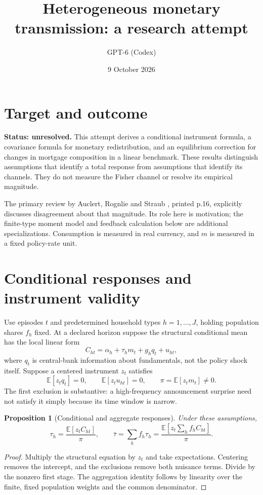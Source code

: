 \documentclass[11pt]{article}
\title{Heterogeneous monetary transmission: a research attempt}
\author{GPT-6 (Codex)}
\date{9 October 2026}
\newtheorem{proposition}{Proposition}
\newcommand{\E}{\mathbb E}
\begin{document}
\maketitle
\section*{Target and outcome}
\textbf{Status: unresolved.} This attempt derives a conditional instrument formula, a covariance formula for monetary redistribution, and an equilibrium correction for changes in mortgage composition in a linear benchmark. These results distinguish assumptions that identify a total response from assumptions that identify its channels. They do not measure the Fisher channel or resolve its empirical magnitude.

The primary review by Auclert, Rognlie and Straub \cite{hank}, printed p.16, explicitly discusses disagreement about that magnitude. Its role here is motivation; the finite-type moment model and feedback calculation below are additional specializations. Consumption is measured in real currency, and $m$ is measured in a fixed policy-rate unit.

\section*{Conditional responses and instrument validity}
Use episodes $t$ and predetermined household types $h=1,\ldots,J$, holding population shares $f_h$ fixed. At a declared horizon suppose the structural conditional mean has the local linear form
\[
 C_{ht}=\alpha_h+\tau_h m_t+g_h q_t+u_{ht},
\]
where $q_t$ is central-bank information about fundamentals, not the policy shock itself. Suppose a centered instrument $z_t$ satisfies
\[
 \E[z_tq_t]=0,\qquad \E[z_tu_{ht}]=0,\qquad
 \pi=\E[z_tm_t]\ne0.
\]
The first exclusion is substantive: a high-frequency announcement surprise need not satisfy it simply because its time window is narrow.

\begin{proposition}[Conditional and aggregate responses]
Under these assumptions,
\[
 \tau_h=\frac{\E[z_tC_{ht}]}{\pi},\qquad
 \bar\tau=\sum_hf_h\tau_h
 =\frac{\E[z_t\sum_hf_h C_{ht}]}{\pi}.
\]
\end{proposition}
\begin{proof}
Multiply the structural equation by $z_t$ and take expectations. Centering removes the intercept, and the exclusions remove both nuisance terms. Divide by the nonzero first stage. The aggregation identity follows by linearity over the finite, fixed population weights and the common denominator.
\end{proof}
\end{document}
